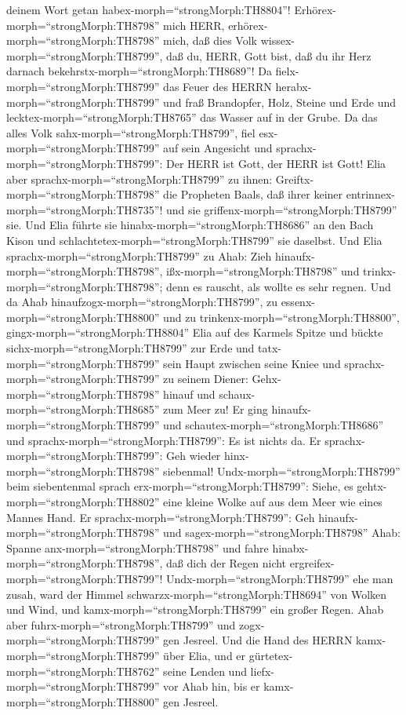 deinem Wort getan habex-morph=``strongMorph:TH8804''! 
Erhörex-morph=``strongMorph:TH8798'' mich HERR,
erhörex-morph=``strongMorph:TH8798'' mich, daß dies Volk
wissex-morph=``strongMorph:TH8799'', daß du, HERR, Gott bist, daß du ihr
Herz darnach bekehrstx-morph=``strongMorph:TH8689''!  Da
fielx-morph=``strongMorph:TH8799'' das Feuer des HERRN
herabx-morph=``strongMorph:TH8799'' und fraß Brandopfer, Holz, Steine
und Erde und lecktex-morph=``strongMorph:TH8765'' das Wasser auf in der
Grube.  Da das alles Volk
sahx-morph=``strongMorph:TH8799'', fiel esx-morph=``strongMorph:TH8799''
auf sein Angesicht und sprachx-morph=``strongMorph:TH8799'': Der HERR
ist Gott, der HERR ist Gott!  Elia aber
sprachx-morph=``strongMorph:TH8799'' zu ihnen:
Greiftx-morph=``strongMorph:TH8798'' die Propheten Baals, daß ihrer
keiner entrinnex-morph=``strongMorph:TH8735''! und sie
griffenx-morph=``strongMorph:TH8799'' sie. Und Elia führte sie
hinabx-morph=``strongMorph:TH8686'' an den Bach Kison und
schlachtetex-morph=``strongMorph:TH8799'' sie daselbst. 
Und Elia sprachx-morph=``strongMorph:TH8799'' zu Ahab: Zieh
hinaufx-morph=``strongMorph:TH8798'', ißx-morph=``strongMorph:TH8798''
und trinkx-morph=``strongMorph:TH8798''; denn es rauscht, als wollte es
sehr regnen.  Und da Ahab
hinaufzogx-morph=``strongMorph:TH8799'', zu
essenx-morph=``strongMorph:TH8800'' und zu
trinkenx-morph=``strongMorph:TH8800'',
gingx-morph=``strongMorph:TH8804'' Elia auf des Karmels Spitze und
bückte sichx-morph=``strongMorph:TH8799'' zur Erde und
tatx-morph=``strongMorph:TH8799'' sein Haupt zwischen seine Kniee
 und sprachx-morph=``strongMorph:TH8799'' zu seinem Diener:
Gehx-morph=``strongMorph:TH8798'' hinauf und
schaux-morph=``strongMorph:TH8685'' zum Meer zu! Er ging
hinaufx-morph=``strongMorph:TH8799'' und
schautex-morph=``strongMorph:TH8686'' und
sprachx-morph=``strongMorph:TH8799'': Es ist nichts da. Er
sprachx-morph=``strongMorph:TH8799'': Geh wieder
hinx-morph=``strongMorph:TH8798'' siebenmal! 
Undx-morph=``strongMorph:TH8799'' beim siebentenmal sprach
erx-morph=``strongMorph:TH8799'': Siehe, es
gehtx-morph=``strongMorph:TH8802'' eine kleine Wolke auf aus dem Meer
wie eines Mannes Hand. Er sprachx-morph=``strongMorph:TH8799'': Geh
hinaufx-morph=``strongMorph:TH8798'' und
sagex-morph=``strongMorph:TH8798'' Ahab: Spanne
anx-morph=``strongMorph:TH8798'' und fahre
hinabx-morph=``strongMorph:TH8798'', daß dich der Regen nicht
ergreifex-morph=``strongMorph:TH8799''! 
Undx-morph=``strongMorph:TH8799'' ehe man zusah, ward der Himmel
schwarzx-morph=``strongMorph:TH8694'' von Wolken und Wind, und
kamx-morph=``strongMorph:TH8799'' ein großer Regen. Ahab aber
fuhrx-morph=``strongMorph:TH8799'' und zogx-morph=``strongMorph:TH8799''
gen Jesreel.  Und die Hand des HERRN
kamx-morph=``strongMorph:TH8799'' über Elia, und er
gürtetex-morph=``strongMorph:TH8762'' seine Lenden und
liefx-morph=``strongMorph:TH8799'' vor Ahab hin, bis er
kamx-morph=``strongMorph:TH8800'' gen Jesreel.


